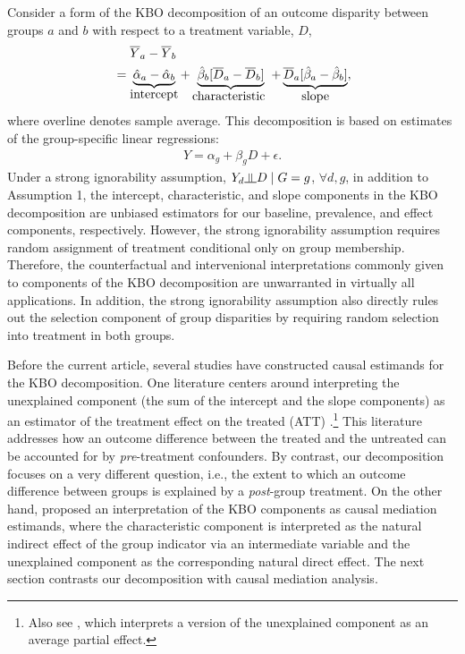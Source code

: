 \documentclass[12pt,a4paper]{article}
\newcommand{\indep}{\rotatebox[origin=c]{90}{$\models$}}  %
\begin{document}
Consider a form of the KBO decomposition of an outcome disparity between groups $a$ and $b$ with respect to a treatment variable, $D$, 
\begin{align*}
&\phantom{{}={}} \overline{Y}_a-\overline{Y}_b   \nonumber  \\
&= \underbrace{ \hat{\alpha}_a-\hat{\alpha}_b }_{\text{\normalsize intercept}}
+ \underbrace{\hat{\beta}_b [\overline{D}_a-\overline{D}_b]}_{\text{\normalsize characteristic }}
+ \underbrace{\overline{D}_a[ \hat{\beta}_a - \hat{\beta}_b ]}_{\text{\normalsize slope}},
\end{align*}
where overline denotes sample average. This decomposition is based on estimates of the group-specific linear regressions:
\begin{gather*}
Y=\alpha_g+\beta_g D + \epsilon.
\end{gather*}
Under a strong ignorability assumption, $Y_d \indep D \mid  G=g$, $\forall d, g$, in addition to Assumption 1, the intercept, characteristic, and slope components in the KBO decomposition are unbiased estimators for our baseline, prevalence, and effect components, respectively. However, the strong ignorability assumption requires random assignment of treatment conditional only on group membership. Therefore, the counterfactual and intervenional interpretations commonly given to components of the KBO decomposition \citep[e.g.,][]{jann_blinderoaxaca_2008} are unwarranted in virtually all applications. In addition, the strong ignorability assumption also directly rules out the selection component of group disparities by requiring random selection into treatment in both groups.

Before the current article, several studies have constructed causal estimands for the KBO decomposition. One literature centers around interpreting the unexplained component (the sum of the intercept and the slope components) as an estimator of the treatment effect on the treated (ATT) \citep{fortin_decomposition_2011, kline_oaxaca-blinder_2011, yamaguchi_decomposition_2015}.\footnote{Also see \citet{chernozhukov_sorted_2018}, which interprets a version of the unexplained component as an average partial effect.} This literature addresses how an outcome difference between the treated and the untreated can be accounted for by \emph{pre}-treatment confounders. By contrast, our decomposition focuses on a very different question, i.e., the extent to which an outcome difference between groups is explained by a \emph{post}-group treatment. On the other hand, \citet{huber_causal_2015} proposed an interpretation of the KBO components as causal mediation estimands, where the characteristic component is interpreted as the natural indirect effect \citep{pearl_direct_2001} of the group indicator via an intermediate variable and the unexplained component as the corresponding natural direct effect. The next section contrasts our decomposition with causal mediation analysis.
\end{document}
